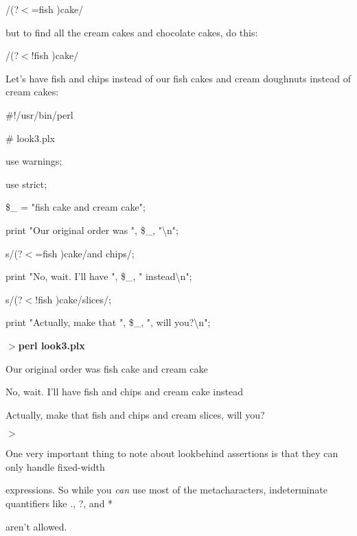 \documentclass[a4paper,11pt]{book}
\begin{document}
\noindent 

\noindent /(?$<$=fish )cake/

\noindent 

\noindent but to find all the cream cakes and chocolate cakes, do this:

\noindent 

\noindent /(?$<$!fish )cake/

\noindent 

\noindent Let's have fish and chips instead of our fish cakes and cream doughnuts instead of cream cakes:

\noindent 

\noindent \#!/usr/bin/perl

\noindent \# look3.plx

\noindent use warnings;

\noindent use strict;

\noindent 

\noindent \$\_  = "fish cake and cream cake";

\noindent print "Our original order was ", \$\_, "\textbackslash n";

\noindent 

\noindent s/(?$<$=fish )cake/and chips/;

\noindent print "No, wait. I'll have ", \$\_, " instead\textbackslash n";

\noindent 

\noindent s/(?$<$!fish )cake/slices/;

\noindent print "Actually, make that ", \$\_, ", will you?\textbackslash n";

\noindent 

\noindent $>$\textbf{perl look3.plx}

\noindent Our original order was fish cake and cream cake

\noindent No, wait. I'll have fish and chips and cream cake instead

\noindent Actually, make that fish and chips and cream slices, will you?

\noindent $>$

\noindent 

\noindent 

\noindent One very important thing to note about lookbehind assertions is that they can only handle fixed-width

\noindent expressions. So while you \textit{can }use most of the metacharacters, indeterminate quantifiers like ., ?, and *

\noindent aren't allowed.
\end{document}
